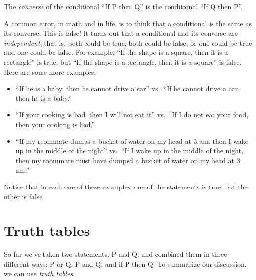 \documentclass{tufte-book}
\begin{document}
  \begin{definition}
    The \emph{converse} of the conditional ``If P then Q'' is the conditional ``If Q then P''.
  \end{definition}
  A common error, in math and in life, is to think that a conditional is the same as its converse. This is false! It turns out that a conditional and its converse are \emph{independent}; that is, both could be true, both could be false, or one could be true and one could be false. For example, ``If the shape is a square, then it is a rectangle'' is true, but ``If the shape is a rectangle, then it is a square'' is false.  Here are some more examples:
\begin{itemize}
    \item ``If he is a baby, then he cannot drive a car'' vs.\ ``If he cannot drive a car, then he is a baby.''
    \item ``If your cooking is bad, then I will not eat it'' vs.\ ``If I do not eat your food, then your cooking is bad.''
    \item ``If my roommate dumps a bucket of water on my head at 3 am, then I wake up in the middle of the night'' vs.\ ``If I wake up in the middle of the night, then my roommate must have dumped a bucket of water on my head at 3 am.''
\end{itemize}
Notice that in each one of these examples, one of the statements is true, but the other is false.



\section{Truth tables}
\label{sec:truth-tables}

So far we've taken two statements, P and Q, and combined them in three different ways: P or Q, P and Q, and if P then Q. To summarize our discussion, we can use \emph{truth tables}. 
\end{document}
